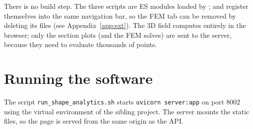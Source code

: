 There is no build step. The three scripts are ES modules loaded by ;  and  register themselves into the same navigation bar, so the FEM tab can be removed by deleting its files (see Appendix~\ref{app:ext}). The 3D field computes entirely in the browser; only the section plots (and the FEM solves) are sent to the server, because they need to evaluate thousands of points.

\section{Running the software}
The script \texttt{run\_shape\_analytics.sh} starts \texttt{uvicorn server:app} on port 8002 using the virtual environment of the sibling project. The server mounts the static files, so the page is served from the same origin as the API.

